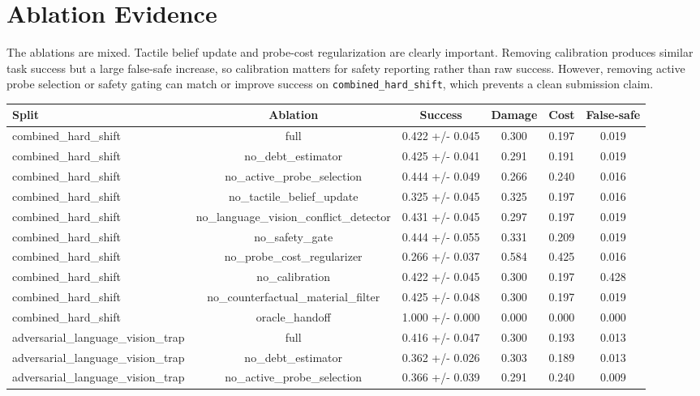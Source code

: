 \documentclass{article}
\begin{document}
\section{Ablation Evidence}
The ablations are mixed. Tactile belief update and probe-cost regularization are clearly important. Removing calibration produces similar task success but a large false-safe increase, so calibration matters for safety reporting rather than raw success. However, removing active probe selection or safety gating can match or improve success on \texttt{combined\_hard\_shift}, which prevents a clean submission claim.


\begin{table}[tbp]
\centering
\scriptsize
\setlength{\tabcolsep}{3pt}
\begin{tabular}{lccccc}
\toprule
Split & Ablation & Success & Damage & Cost & False-safe \\
\midrule
combined\_hard\_shift & full & 0.422 +/- 0.045 & 0.300 & 0.197 & 0.019 \\
combined\_hard\_shift & no\_debt\_estimator & 0.425 +/- 0.041 & 0.291 & 0.191 & 0.019 \\
combined\_hard\_shift & no\_active\_probe\_selection & 0.444 +/- 0.049 & 0.266 & 0.240 & 0.016 \\
combined\_hard\_shift & no\_tactile\_belief\_update & 0.325 +/- 0.045 & 0.325 & 0.197 & 0.016 \\
combined\_hard\_shift & no\_language\_vision\_conflict\_detector & 0.431 +/- 0.045 & 0.297 & 0.197 & 0.019 \\
combined\_hard\_shift & no\_safety\_gate & 0.444 +/- 0.055 & 0.331 & 0.209 & 0.019 \\
combined\_hard\_shift & no\_probe\_cost\_regularizer & 0.266 +/- 0.037 & 0.584 & 0.425 & 0.016 \\
combined\_hard\_shift & no\_calibration & 0.422 +/- 0.045 & 0.300 & 0.197 & 0.428 \\
combined\_hard\_shift & no\_counterfactual\_material\_filter & 0.425 +/- 0.048 & 0.300 & 0.197 & 0.019 \\
combined\_hard\_shift & oracle\_handoff & 1.000 +/- 0.000 & 0.000 & 0.000 & 0.000 \\
adversarial\_language\_vision\_trap & full & 0.416 +/- 0.047 & 0.300 & 0.193 & 0.013 \\
adversarial\_language\_vision\_trap & no\_debt\_estimator & 0.362 +/- 0.026 & 0.303 & 0.189 & 0.013 \\
adversarial\_language\_vision\_trap & no\_active\_probe\_selection & 0.366 +/- 0.039 & 0.291 & 0.240 & 0.009 \\

\end{tabular}
\end{table}
\end{document}
